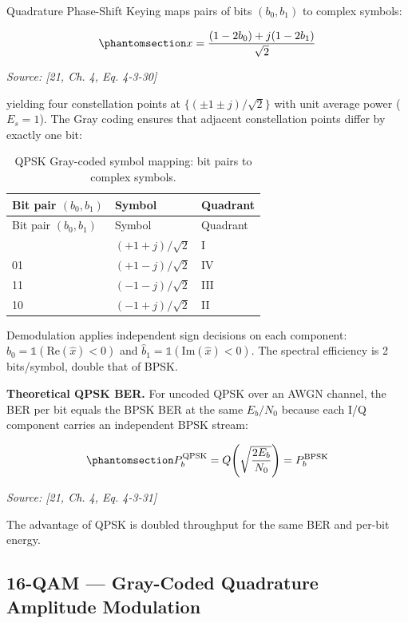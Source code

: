 Quadrature Phase-Shift Keying maps pairs of bits \((b_0, b_1)\) to complex symbols:

\begin{equation}\protect\phantomsection\label{eq:qpsk-mapping}{x = \frac{(1 - 2b_0) + j(1 - 2b_1)}{\sqrt{2}}
}\end{equation} \par{\small\textit{Source: [21, Ch. 4, Eq. 4-3-30]}}

yielding four constellation points at \(\{(\pm 1 \pm j)/\sqrt{2}\}\) with unit average power (\(E_s = 1\)). The Gray coding ensures that adjacent constellation points differ by exactly one bit:

\begin{longtable}[]{@{}lll@{}}
\caption{QPSK Gray-coded symbol mapping: bit pairs to complex symbols.}\label{tbl:table29}\tabularnewline
\toprule\noalign{}
Bit pair \((b_0, b_1)\) & Symbol & Quadrant \\
\midrule\noalign{}
\endfirsthead
\toprule\noalign{}
Bit pair \((b_0, b_1)\) & Symbol & Quadrant \\
\midrule\noalign{}
\endhead
\bottomrule\noalign{}
\endlastfoot
00 & \((+1+j)/\sqrt{2}\) & I \\
01 & \((+1-j)/\sqrt{2}\) & IV \\
11 & \((-1-j)/\sqrt{2}\) & III \\
10 & \((-1+j)/\sqrt{2}\) & II \\
\end{longtable}

Demodulation applies independent sign decisions on each component: \(\hat{b}_0 = \mathbb{1}(\text{Re}(\hat{x}) < 0)\) and \(\hat{b}_1 = \mathbb{1}(\text{Im}(\hat{x}) < 0)\). The spectral efficiency is 2 bits/symbol, double that of BPSK.

\textbf{Theoretical QPSK BER.} For uncoded QPSK over an AWGN channel, the BER per bit equals the BPSK BER at the same \(E_b/N_0\) because each I/Q component carries an independent BPSK stream:

\begin{equation}\protect\phantomsection\label{eq:qpsk-ber}{P_b^{\text{QPSK}} = Q\!\left(\sqrt{\frac{2E_b}{N_0}}\right) = P_b^{\text{BPSK}}
}\end{equation} \par{\small\textit{Source: [21, Ch. 4, Eq. 4-3-31]}}

The advantage of QPSK is doubled throughput for the same BER and per-bit energy.

\subsection{16-QAM --- Gray-Coded Quadrature Amplitude Modulation}\label{sec:qam-gray-coded-quadrature-amplitude-modulation}

